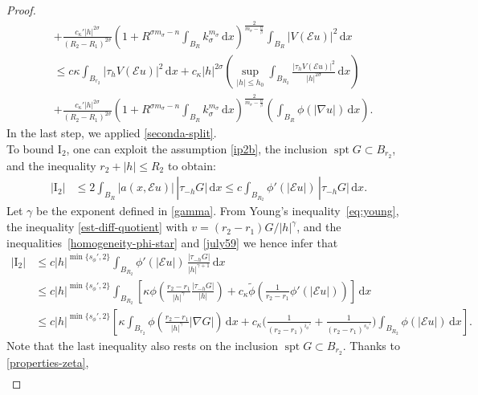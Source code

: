 \documentclass[leqno,11pt]{amsart}%
\numberwithin{equation}{section}
\def\d{\mathrm{d}}
\def\E{\mathcal{E}}
\def\dx{\d x}
\DeclareMathOperator\spt{spt}
\theoremstyle{definition}
\numberwithin{equation}{section}
\begin{document}
\begin{proof}
\begin{align}
  &+ \frac{c_{\kappa}'|h|^{2\sigma}}{(R_2-R_1)^{ {2\sigma}}}
  \left(1+ {R^{\sigma {m_\sigma}-n}}\int_{B_{R}}k_\sigma^{{m_\sigma}}\,\dx\right)^{{\frac{2}{{m_\sigma}-\frac{n}{\beta}}}}\int_{B_{R}}|V(\E u)|^2\,\dx\\\nonumber
  &\le
      c\kappa \int_{B_{r_2}}|\tau_hV(\E u)|^2\,\dx+
     c_\kappa |h|^{2\sigma} \left(\sup_{{|h|\leq h_0}}\int_{B_{R_2}}\frac{|\tau_hV(\E u)|^2}{|h|^{2\sigma}}\,\dx\right)\\\nonumber 
  &+ \frac{c_{\kappa}'|h|^{2\sigma}}{(R_2-R_1)^{ {2\sigma}}}
  \left(1+
  {R^{\sigma {m_\sigma}-n}}
 \int_{B_{R}}k_\sigma^{{m_\sigma}}\,\dx\right)^{{\frac{2}{{m_\sigma}-\frac{n}{\beta}}}}\left(\int_{B_{R}}\phi(|\nabla u|)\,\dx\right).
  \end{align}
  In the last step, we applied \eqref{seconda-split}. 
    \\ To bound $\mathrm{I}_2$, 
one can exploit the assumption \eqref{ip2b},  
  the inclusion $\spt G\subset B_{r_2}$, and the inequality $r_2+|h|\le R_2$ to obtain:
  \begin{align*}
    |\mathrm{I}_2|
    &\le
      2\int_{B_R}\big|a(x,\E u)\big|\,|\tau_{-h}G\big|\,\dx
      \le
    c\int_{B_{R_2}}\phi'(|\E u|)\,|\tau_{-h}G|\,\dx.
  \end{align*}
  Let 
  $\gamma$ be the exponent defined in \eqref{gamma}. From  Young's
  inequality~\eqref{eq:young}, the inequality
  \eqref{est-diff-quotient} with $v=(r_2-r_1)G/|h|^\gamma$,
  and the inequalities~\eqref{homogeneity-phi-star}   and \eqref{july59}  we hence infer that
 \begin{align}\label{first-est-I2}
    |\mathrm{I}_2|
    &\le
      c|h|^{\min\{s_\phi',2\}}\int_{B_{R_2}}\phi'(|\E u|)\,\frac{|\tau_{-h}G|}{|h|^{\gamma+1}}\,\dx\\\nonumber
    &\le
      c|h|^{\min\{s_\phi',2\}}
      \int_{B_{R_2}}\left[
      \kappa
      \phi\left(\frac{r_2-r_1}{|h|^\gamma}\frac{|\tau_{-h}G|}{|h|}\right)
      +
      c_\kappa \widetilde \phi\left(\frac1{r_2-r_1}\phi'(|\E u|)\right)\right]\,\dx\\\nonumber
    &\le
      c|h|^{\min\{s_\phi',2\}}\left[\kappa\int_{B_{r_2}}
      \phi\left(\frac{r_2-r_1}{|h|^\gamma}|\nabla G|\right)\,\dx
      +
      c_\kappa \Bigg(\frac{1}{(r_2-r_1)^{i_\phi'}}
     +\frac{1}{(r_2-r_1)^{s_\phi'}}
      \Bigg)\int_{B_{R_2}}\phi(|\E u|)
      \,\dx\right].
  \end{align}
  Note that the last inequality also rests on the inclusion $\spt G\subset B_{r_2}$.
  Thanks to \eqref{properties-zeta},
  \begin{align*}

\end{align*}
\end{proof}
\end{document}
